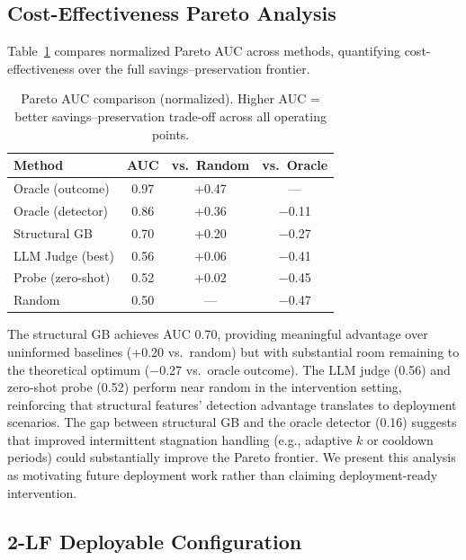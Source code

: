 \documentclass[11pt,a4paper]{article}
\begin{document}
\subsection{Cost-Effectiveness Pareto Analysis}
\label{sec:pareto}

Table~\ref{tab:pareto} compares normalized Pareto AUC across methods, quantifying cost-effectiveness over the full savings--preservation frontier.

\begin{table}[t]
\centering
\small
\caption{Pareto AUC comparison (normalized). Higher AUC = better savings--preservation trade-off across all operating points.}
\label{tab:pareto}
\begin{tabular}{lccc}
\toprule
\textbf{Method} & \textbf{AUC} & \textbf{vs.\ Random} & \textbf{vs.\ Oracle} \\
\midrule
Oracle (outcome) & 0.97 & +0.47 & --- \\
Oracle (detector) & 0.86 & +0.36 & $-$0.11 \\
Structural GB & 0.70 & +0.20 & $-$0.27 \\
LLM Judge (best) & 0.56 & +0.06 & $-$0.41 \\
Probe (zero-shot) & 0.52 & +0.02 & $-$0.45 \\
Random & 0.50 & --- & $-$0.47 \\
\bottomrule
\end{tabular}
\vspace{-2mm}
\end{table}

The structural GB achieves AUC 0.70, providing meaningful advantage over uninformed baselines (+0.20 vs.\ random) but with substantial room remaining to the theoretical optimum ($-$0.27 vs.\ oracle outcome). The LLM judge (0.56) and zero-shot probe (0.52) perform near random in the intervention setting, reinforcing that structural features' detection advantage translates to deployment scenarios. The gap between structural GB and the oracle detector (0.16) suggests that improved intermittent stagnation handling (e.g., adaptive $k$ or cooldown periods) could substantially improve the Pareto frontier. We present this analysis as motivating future deployment work rather than claiming deployment-ready intervention.

\subsection{2-LF Deployable Configuration}
\label{sec:2lf}
\end{document}
